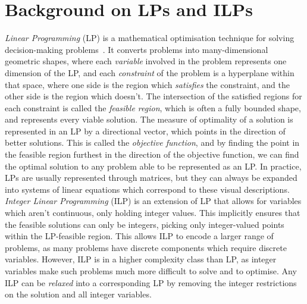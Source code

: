 \section{Background on LPs and ILPs}
\textit{Linear Programming} (LP) is a mathematical optimisation technique for solving decision-making problems~\citep{Karloff1991}. It converts problems into many-dimensional geometric shapes, where each \textit{variable} involved in the problem represents one dimension of the LP, and each \textit{constraint} of the problem is a hyperplane within that space, where one side is the region which \textit{satisfies} the constraint, and the other side is the region which doesn't. The intersection of the satisfied regions for each constraint is called the \textit{feasible region}, which is often a fully bounded shape, and represents every viable solution. The measure of optimality of a solution is represented in an LP by a directional vector, which points in the direction of better solutions. This is called the \textit{objective function}, and by finding the point in the feasible region furthest in the direction of the objective function, we can find the optimal solution to any problem able to be represented as an LP. In practice, LPs are usually represented through matrices, but they can always be expanded into systems of linear equations which correspond to these visual descriptions.\\

\textit{Integer Linear Programming} (ILP) is an extension of LP that allows for variables which aren't continuous, only holding integer values. This implicitly ensures that the feasible solutions can only be integers, picking only integer-valued points within the LP-feasible region. This allows ILP to encode a larger range of problems, as many problems have discrete components which require discrete variables. However, ILP is in a higher complexity class than LP, as integer variables make such problems much more difficult to solve and to optimise. Any ILP can be \textit{relaxed} into a corresponding LP by removing the integer restrictions on the solution and all integer variables.\\

